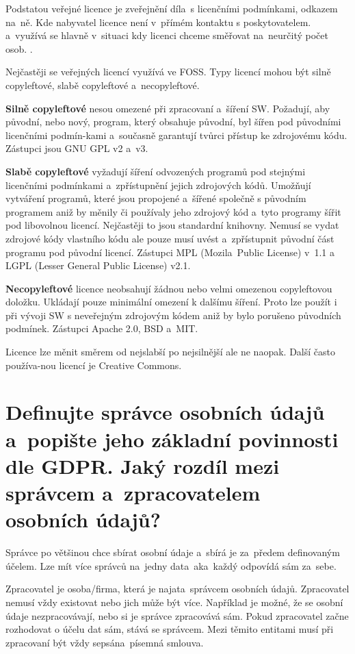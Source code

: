 Podstatou veřejné licence je zveřejnění díla~s licenčními podmínkami, odkazem na~ně. Kde nabyvatel licence není v~přímém kontaktu s poskytovatelem. a~využívá se hlavně v~situaci kdy licenci chceme směřovat na~neurčitý počet osob. .

Nejčastěji se veřejných licencí využívá ve FOSS\@. Typy licencí mohou být silně copyleftové, slabě copyleftové a~necopyleftové.

\textbf{Silně copyleftové} nesou omezené při zpracovaní a~šíření SW\@. Požadují, aby původní, nebo nový, program, který obsahuje původní, byl šířen pod původními licenčními podmín-kami a~současně garantují tvůrci přístup ke zdrojovému kódu. Zástupci jsou GNU GPL v2 a~v3.

\textbf{Slabě copyleftové} vyžadují šíření odvozených programů pod stejnými licenčními podmínkami a~zpřístupnění jejich zdrojových kódů. Umožňují vytváření programů, které jsou propojené a~šířené společně s původním programem aniž by měnily či používaly jeho zdrojový kód a~tyto programy šířit pod libovolnou licencí. Nejčastěji to jsou standardní knihovny. Nemusí se vydat zdrojové kódy vlastního kódu ale pouze musí uvést a~zpřístupnit původní část programu pod původní licencí. Zástupci MPL (Mozila~Public License) v~1.1 a~ LGPL (Lesser General Public License) v2.1.

\textbf{Necopyleftové} licence neobsahují žádnou nebo velmi omezenou copyleftovou doložku. Ukládají pouze minimální omezení k dalšímu šíření. Proto lze použít i při vývoji SW s neveřejným zdrojovým kódem aniž by bylo porušeno původních podmínek. Zástupci Apache 2.0, BSD a~MIT\@.

Licence lze měnit směrem od nejslabší po nejsilnější ale ne naopak. Další často používa-nou licencí je Creative Commons.


\section{Definujte správce osobních údajů a~popište jeho základní povinnosti dle GDPR\@. Jaký rozdíl mezi správcem a~zpracovatelem osobních údajů?}

Správce po většinou chce sbírat osobní údaje a~sbírá je za~předem definovaným účelem. Lze mít více správců na~jedny data~aka~každý odpovídá sám za~sebe.

Zpracovatel je osoba/firma, která je najata~správcem osobních údajů. Zpracovatel nemusí vždy existovat nebo jich může být více. Například je možné, že se osobní údaje nezpracovávají, nebo si je správce zpracovává sám. Pokud zpracovatel začne rozhodovat o účelu dat sám, stává se správcem. Mezi těmito entitami musí při zpracovaní být vždy sepsána~písemná smlouva.

